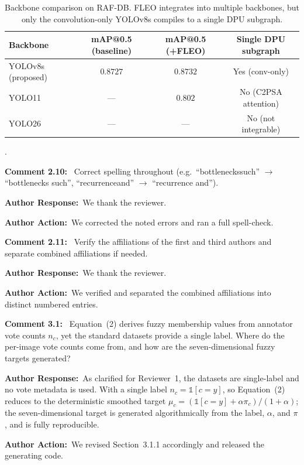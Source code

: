 \documentclass[11pt]{article}
\newcommand{\comment}[1]{\smallskip\noindent\textbf{\color{navy}Comment #1:}\ }
\newcommand{\response}{\smallskip\par\noindent\textbf{\color{steel}Author Response:}\ }
\newcommand{\action}{\smallskip\par\noindent\textbf{\color{steel}Author Action:}\ }
\newcommand{\rev}[1]{\medskip\par\noindent{\large\bfseries\color{navy}#1}\par\smallskip}
\begin{document}
\begin{table}[!h]
\centering
\small
\caption{Backbone comparison on RAF-DB. FLEO integrates into multiple backbones, but only the
convolution-only YOLOv8s compiles to a single DPU subgraph.}
\label{tab:backbones}
\begin{tabular}{lccc}
\toprule
Backbone & mAP@0.5 (baseline) & mAP@0.5 (+FLEO) & Single DPU subgraph \\
\midrule
YOLOv8s (proposed) & $0.8727$ & $0.8732$ & Yes (conv-only) \\
YOLO11             & ---      & $0.802$  & No (C2PSA attention) \\
YOLO26             & ---      & ---      & No (not integrable) \\
\bottomrule
\end{tabular}
\end{table}.

\comment{2.10} Correct spelling throughout (e.g.\ ``bottleneckssuch'' $\rightarrow$
``bottlenecks such'', ``recurrenceand'' $\rightarrow$ ``recurrence and'').
\response We thank the reviewer.
\action We corrected the noted errors and ran a full spell-check.

\comment{2.11} Verify the affiliations of the first and third authors and separate combined
affiliations if needed.
\response We thank the reviewer.
\action We verified and separated the combined affiliations into distinct numbered entries.

\rev{Reviewer 3}

\comment{3.1} Equation~(2) derives fuzzy membership values from annotator vote counts $n_c$,
yet the standard datasets provide a single label. Where do the per-image vote counts come
from, and how are the seven-dimensional fuzzy targets generated?
\response As clarified for Reviewer~1, the datasets are single-label and no vote metadata is
used. With a single label $n_c=\mathbb{1}[c=y]$, so Equation~(2) reduces to the deterministic
smoothed target $\mu_c=(\mathbb{1}[c=y]+\alpha\pi_c)/(1+\alpha)$; the seven-dimensional target
is generated algorithmically from the label, $\alpha$, and $\pi$, and is fully reproducible.
\action We revised Section~3.1.1 accordingly and released the generating code.
\end{document}
